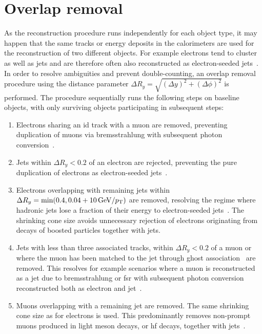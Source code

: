 \section{Overlap removal}\label{sec:overlap_removal}

As the reconstruction procedure runs independently for each object type, it may happen that the same tracks or energy deposits in the calorimeters are used for the reconstruction of two different objects. For example electrons tend to cluster as well as jets and are therefore often also reconstructed as electron-seeded jets~\cite{overlapremoval:1700874}. In order to resolve ambiguities and prevent double-counting, an overlap removal procedure using the distance parameter $\Delta R_y = \sqrt{(\Delta y)^2+(\Delta \phi)^2}$ is performed. The procedure sequentially runs the following steps on baseline objects, with only surviving objects participating in subsequent steps:
\begin{enumerate}
	\item Electrons sharing an \gls{id} track with a muon are removed, preventing duplication of muons via bremsstrahlung with subsequent photon conversion~\cite{overlapremoval:1700874}.
	\item Jets within $\Delta R_y < 0.2$ of an electron are rejected, preventing the pure duplication of electrons as electron-seeded jets~\cite{overlapremoval:1700874}.
	\item Electrons overlapping with remaining jets within $\Delta R_y = \min (0.4, 0.04+\SI{10}{\GeV}/\pt)$ are removed, resolving the regime where hadronic jets lose a fraction of their energy to electron-seeded jets~\cite{overlapremoval:1700874}. The shrinking cone size avoids unnecessary rejection of electrons originating from decays of boosted particles together with jets.
	\item Jets with less than three associated tracks, within $\Delta R_y < 0.2$ of a muon or where the muon has been matched to the jet through ghost association~\cite{ghostassociation:2008gn} are removed. This resolves for example scenarios where a muon is reconstructed as a jet due to bremsstrahlung or \gls{fsr} with subsequent photon conversion reconstructed both as electron and jet~\cite{overlapremoval:1700874}.
	\item Muons overlapping with a remaining jet are removed. The same shrinking cone size as for electrons is used. This predominantly removes non-prompt muons produced in light meson decays, or \gls{hf} decays, together with jets~\cite{overlapremoval:1700874}. 
\end{enumerate} 


